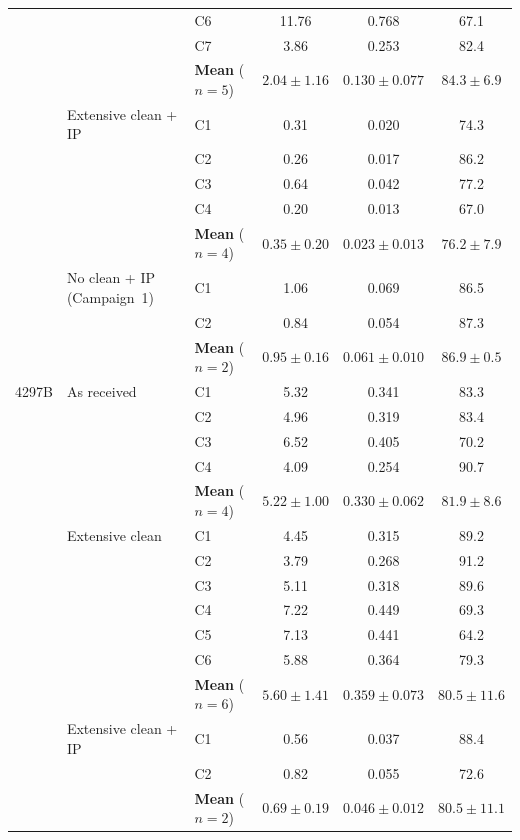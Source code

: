 {\begin{longtable}{lllccc}
   &  & C6 & 11.76 & 0.768 & 67.1 \\
   &  & C7 & 3.86 & 0.253 & 82.4 \\
   & & \textbf{Mean} ($n=5$) & $2.04 \pm 1.16$ & $0.130 \pm 0.077$ & $84.3 \pm 6.9$ \\
  \addlinespace
   & Extensive clean + IP & C1 & 0.31 & 0.020 & 74.3 \\
   &  & C2 & 0.26 & 0.017 & 86.2 \\
   &  & C3 & 0.64 & 0.042 & 77.2 \\
   &  & C4 & 0.20 & 0.013 & 67.0 \\
   & & \textbf{Mean} ($n=4$) & $0.35 \pm 0.20$ & $0.023 \pm 0.013$ & $76.2 \pm 7.9$ \\
  \addlinespace
   & No clean + IP (Campaign~1) & C1 & 1.06 & 0.069 & 86.5 \\
   &  & C2 & 0.84 & 0.054 & 87.3 \\
   & & \textbf{Mean} ($n=2$) & $0.95 \pm 0.16$ & $0.061 \pm 0.010$ & $86.9 \pm 0.5$ \\
  \midrule
  4297B & As received & C1 & 5.32 & 0.341 & 83.3 \\
   &  & C2 & 4.96 & 0.319 & 83.4 \\
   &  & C3 & 6.52 & 0.405 & 70.2 \\
   &  & C4 & 4.09 & 0.254 & 90.7 \\
   & & \textbf{Mean} ($n=4$) & $5.22 \pm 1.00$ & $0.330 \pm 0.062$ & $81.9 \pm 8.6$ \\
  \addlinespace
   & Extensive clean & C1 & 4.45 & 0.315 & 89.2 \\
   &  & C2 & 3.79 & 0.268 & 91.2 \\
   &  & C3 & 5.11 & 0.318 & 89.6 \\
   &  & C4 & 7.22 & 0.449 & 69.3 \\
   &  & C5 & 7.13 & 0.441 & 64.2 \\
   &  & C6 & 5.88 & 0.364 & 79.3 \\
   & & \textbf{Mean} ($n=6$) & $5.60 \pm 1.41$ & $0.359 \pm 0.073$ & $80.5 \pm 11.6$ \\
  \addlinespace
   & Extensive clean + IP & C1 & 0.56 & 0.037 & 88.4 \\
   &  & C2 & 0.82 & 0.055 & 72.6 \\
   & & \textbf{Mean} ($n=2$) & $0.69 \pm 0.19$ & $0.046 \pm 0.012$ & $80.5 \pm 11.1$ \\
\end{longtable}}


